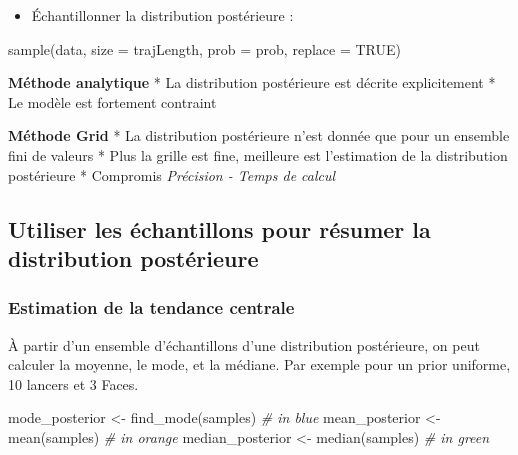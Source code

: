 \documentclass[
  a4paper,11pt,twoside,onecolumn,openright,final,oldfontcommands]{memoir}
\newenvironment{Shaded}{\begin{snugshade}}{\end{snugshade}}
\newcommand{\AttributeTok}[1]{\textcolor[rgb]{0.77,0.63,0.00}{#1}}
\newcommand{\CommentTok}[1]{\textcolor[rgb]{0.56,0.35,0.01}{\textit{#1}}}
\newcommand{\ConstantTok}[1]{\textcolor[rgb]{0.00,0.00,0.00}{#1}}
\newcommand{\FunctionTok}[1]{\textcolor[rgb]{0.00,0.00,0.00}{#1}}
\newcommand{\NormalTok}[1]{#1}
\newcommand{\OtherTok}[1]{\textcolor[rgb]{0.56,0.35,0.01}{#1}}
\providecommand{\tightlist}{%
  \setlength{\itemsep}{0pt}\setlength{\parskip}{0pt}}
\theoremstyle{definition}
\theoremstyle{definition}
\theoremstyle{definition}
\theoremstyle{definition}
\theoremstyle{remark}
\begin{document}
\begin{itemize}
\tightlist
\item
  Échantillonner la distribution postérieure :
\end{itemize}

\begin{Shaded}
\begin{Highlighting}[]
\FunctionTok{sample}\NormalTok{(data, }\AttributeTok{size =}\NormalTok{ trajLength, }\AttributeTok{prob =}\NormalTok{ prob, }\AttributeTok{replace =} \ConstantTok{TRUE}\NormalTok{)}
\end{Highlighting}
\end{Shaded}

\textbf{Méthode analytique}
* La distribution postérieure est décrite explicitement
* Le modèle est fortement contraint

\textbf{Méthode Grid}
* La distribution postérieure n'est donnée que pour un ensemble fini de valeurs
* Plus la grille est fine, meilleure est l'estimation de la distribution postérieure
* Compromis \emph{Précision - Temps de calcul}

\hypertarget{utiliser-les-uxe9chantillons-pour-ruxe9sumer-la-distribution-postuxe9rieure}{%
\subsection{Utiliser les échantillons pour résumer la distribution postérieure}\label{utiliser-les-uxe9chantillons-pour-ruxe9sumer-la-distribution-postuxe9rieure}}

\hypertarget{estimation-de-la-tendance-centrale}{%
\subsubsection{Estimation de la tendance centrale}\label{estimation-de-la-tendance-centrale}}

À partir d'un ensemble d'échantillons d'une distribution postérieure, on peut calculer la moyenne, le mode, et la médiane. Par exemple pour un prior uniforme, 10 lancers et 3 Faces.

\begin{Shaded}
\begin{Highlighting}[]
\NormalTok{mode\_posterior }\OtherTok{\textless{}{-}} \FunctionTok{find\_mode}\NormalTok{(samples) }\CommentTok{\# in blue}
\NormalTok{mean\_posterior }\OtherTok{\textless{}{-}} \FunctionTok{mean}\NormalTok{(samples) }\CommentTok{\# in orange}
\NormalTok{median\_posterior }\OtherTok{\textless{}{-}} \FunctionTok{median}\NormalTok{(samples) }\CommentTok{\# in green}
\end{Highlighting}
\end{Shaded}
\end{document}
